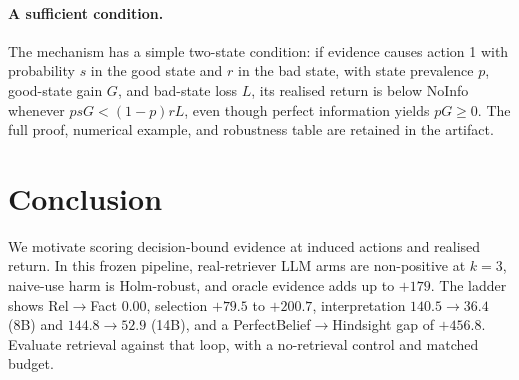 \documentclass[a4paper,runningheads]{llncs}
\begin{document}
\paragraph{A sufficient condition.}
The mechanism has a simple two-state condition: if evidence causes action 1
with probability $s$ in the good state and $r$ in the bad state, with state
prevalence $p$, good-state gain $G$, and bad-state loss $L$, its realised
return is below NoInfo whenever $psG < (1-p)rL$, even though perfect
information yields $pG\geq0$. The full proof, numerical example, and
robustness table are retained in the artifact.

\section{Conclusion}
\label{sec:conclusion}

We motivate scoring decision-bound evidence at induced actions and realised
return. In this frozen pipeline, real-retriever LLM arms are non-positive at
$k=3$, naive-use harm is Holm-robust, and oracle evidence adds up to $+179$.
The ladder shows Rel$\to$Fact $0.00$, selection $+79.5$ to $+200.7$,
interpretation $140.5\to36.4$ (8B) and $144.8\to52.9$ (14B), and a
PerfectBelief$\to$Hindsight gap of $+456.8$. Evaluate retrieval against that
loop, with a no-retrieval control and matched budget.

\label{endofcontent}



\end{document}
